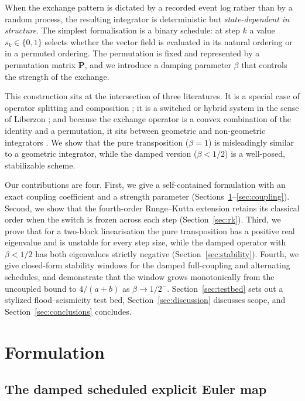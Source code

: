 \documentclass[12pt, a4paper]{article}
\theoremstyle{plain}
\theoremstyle{definition}
\theoremstyle{remark}
\newcommand{\bP}{\mathbf{P}}
\begin{document}
When the exchange pattern is dictated by a recorded event log rather than by a
random process, the resulting integrator is deterministic but
\emph{state-dependent in structure}. The simplest formalisation is a binary
schedule: at step $k$ a value $s_k \in \{0,1\}$ selects whether the vector
field is evaluated in its natural ordering or in a permuted ordering. The
permutation is fixed and represented by a permutation matrix $\bP$, and we
introduce a damping parameter $\beta$ that controls the strength of the
exchange.

This construction sits at the intersection of three literatures. It is a
special case of operator splitting and composition
\cite{strang1968,mclachlan2002}; it is a switched or hybrid system in the
sense of Liberzon \cite{liberzon2003}; and because the exchange operator is a
convex combination of the identity and a permutation, it sits between
geometric and non-geometric integrators
\cite{hairer2006,leimkuhler2004}. We show that the pure transposition
($\beta = 1$) is misleadingly similar to a geometric integrator, while the
damped version ($\beta < 1/2$) is a well-posed, stabilizable scheme.

Our contributions are four. First, we give a self-contained formulation with
an exact coupling coefficient and a strength parameter
(Sections~\ref{sec:formulation}--\ref{sec:coupling}). Second, we show that the
fourth-order Runge--Kutta extension retains its classical order when the
switch is frozen across each step (Section~\ref{sec:rk}). Third, we prove that
for a two-block linearisation the pure transposition has a positive real
eigenvalue and is unstable for every step size, while the damped operator with
$\beta < 1/2$ has both eigenvalues strictly negative
(Section~\ref{sec:stability}). Fourth, we give closed-form stability windows
for the damped full-coupling and alternating schedules, and demonstrate that
the window grows monotonically from the uncoupled bound to $4/(a+b)$ as
$\beta \to 1/2^-$. Section~\ref{sec:testbed} sets out a stylized
flood--seismicity test bed, Section~\ref{sec:discussion} discusses scope, and
Section~\ref{sec:conclusions} concludes.

\section{Formulation}
\label{sec:formulation}

\subsection{The damped scheduled explicit Euler map}
\end{document}
